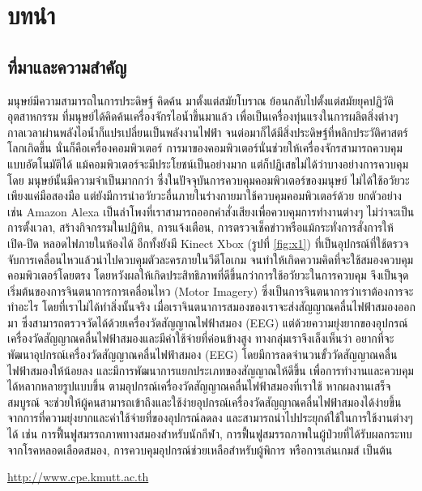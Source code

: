 \documentclass[12pt,oneside,openright,a4paper]{explo-thai-project}
\begin{document}
\chapter{บทนำ}

\section{ที่มาและความสำคัญ}

มนุษย์มีความสามารถในการประดิษฐ์ \cite{hypersense,bworld} คิดค้น มาตั้งแต่สมัยโบราณ ย้อนกลับไปตั้งแต่สมัยยุคปฏิวัติอุตสาหกรรม ที่มนุษย์ได้คิดค้นเครื่องจักรไอน้ำขึ้นมาแล้ว เพื่อเป็นเครื่องทุ่นแรงในการผลิตสิ่งต่างๆ กาลเวลาผ่านพลังไอน้ำก็แปรเปลี่ยนเป็นพลังงานไฟฟ้า จนต่อมาก็ได้มีสิ่งประดิษฐ์ที่พลิกประวัติศาสตร์โลกเกิดขึ้น นั่นก็คือเครื่องคอมพิวเตอร์ การมาของคอมพิวเตอร์นั่นช่วยให้เครื่องจักรสามารถควบคุมแบบอัตโนมัติได้ แม้คอมพิวเตอร์จะมีประโยชน์เป็นอย่างมาก แต่ก็ปฏิเสธไม่ได้ว่าบางอย่างการควบคุมโดย มนุษย์นั้นมีความจำเป็นมากกว่า ซึ่งในปัจจุบันการควบคุมคอมพิวเตอร์ของมนุษย์ ไม่ได้ใช้อวัยวะเพียงแค่มือสองมือ แต่ยังมีการนำอวัยวะอื่นภายในร่างกายมาใช้ควบคุมคอมพิวเตอร์ด้วย ยกตัวอย่างเช่น Amazon Alexa เป็นลำโพงที่เราสามารถออกคำสั่งเสียงเพื่อควบคุมการทำงานต่างๆ ไม่ว่าจะเป็น การตั้งเวลา, สร้างกิจกรรมในปฏิทิน, การแจ้งเตือน, การตรวจเช็คข่าวหรือแม้กระทั่งการสั่งการให้ เปิด-ปิด หลอดไฟภายในห้องได้ อีกทั้งยังมี Kinect Xbox (รูปที่ \ref{fig:x1}) ที่เป็นอุปกรณ์ที่ใช้ตรวจจับการเคลื่อนไหวแล้วนำไปควบคุมตัวละครภายในวีดีโอเกม จนทำให้เกิดความคิดที่จะใช้สมองควบคุมคอมพิวเตอร์โดยตรง โดยหวังผลให้เกิดประสิทธิภาพที่ดีขึ้นกว่าการใช้อวัยวะในการควบคุม จึงเป็นจุดเริ่มต้นของการจินตนาการการเคลื่อนไหว (Motor Imagery) ซึ่งเป็นการจินตนาการว่าเราต้องการจะทำอะไร โดยที่เราไม่ได้ทำสิ่งนั้นจริง เมื่อเราจินตนาการสมองของเราจะส่งสัญญาณคลื่นไฟฟ้าสมองออกมา ซึ่งสามารถตรวจวัดได้ด้วยเครื่องวัดสัญญาณไฟฟ้าสมอง (EEG) 
แต่ด้วยความยุ่งยากของอุปกรณ์เครื่องวัดสัญญาณคลื่นไฟฟ้าสมองและมีค่าใช้จ่ายที่ค่อนข้างสูง ทางกลุ่มเราจึงเล็งเห็นว่า อยากที่จะพัฒนาอุปกรณ์เครื่องวัดสัญญาณคลื่นไฟฟ้าสมอง (EEG) โดยมีการลดจำนวนขั้ววัดสัญญาณคลื่นไฟฟ้าสมองให้น้อยลง และมีการพัฒนาการแยกประเภทของสัญญาณให้ดีขึ้น เพื่อการทำงานและควบคุมได้หลากหลายรูปแบบขึ้น ตามอุปกรณ์เครื่องวัดสัญญาณคลื่นไฟฟ้าสมองที่เราใช้ หากผลงานเสร็จสมบูรณ์ จะช่วยให้ผู้คนสามารถเข้าถึงและใช้ง่ายอุปกรณ์เครื่องวัดสัญญาณคลื่นไฟฟ้าสมองได้ง่ายขึ้น จากการที่ความยุ่งยากและค่าใช้จ่ายที่ของอุปกรณ์ลดลง และสามารถนำไปประยุกต์ใช้ในการใช้งานต่างๆได้ เช่น การฟื้นฟูสมรรถภาพทางสมองสำหรับนักกีฬา, การฟื้นฟูสมรรถภาพในผู้ป่วยที่ได้รับผลกระทบจากโรคหลอดเลือดสมอง, การควบคุมอุปกรณ์ช่วยเหลือสำหรับผู้พิการ หรือการเล่นเกมส์ เป็นต้น

\url{http://www.cpe.kmutt.ac.th}
\end{document}
